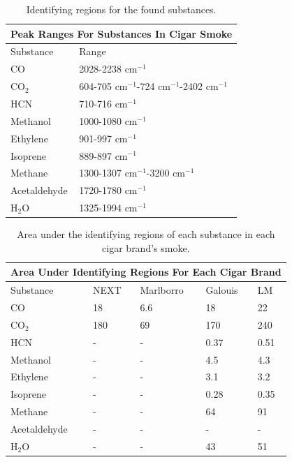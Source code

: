 \documentclass[reprint,amsmath,amssymb,aps, prl]{revtex4-2}
\begin{document}
\begin{table}[h]
    \begin{tabular}{ |p{2.3cm}|p{3cm}|  }
     \hline
     \multicolumn{2}{|c|}{Peak Ranges For Substances In Cigar Smoke} \\ \hline
     Substance & Range\\ \hline
     CO & 2028-2238 $\text{cm}^{-1}$\\ \hline
     $\text{CO}_{2}$ & 604-705 $\text{cm}^{-1}$\newline 717-724 $\text{cm}^{-1}$\newline 2248-2402 $\text{cm}^{-1}$\\ \hline
     HCN & 710-716 $\text{cm}^{-1}$\\ \hline
     Methanol & 1000-1080 $\text{cm}^{-1}$\\ \hline
     Ethylene & 901-997 $\text{cm}^{-1}$\\ \hline
     Isoprene & 889-897 $\text{cm}^{-1}$\\ \hline
     Methane & 1300-1307 $\text{cm}^{-1}$\newline 2820-3200 $\text{cm}^{-1}$\\ \hline
     Acetaldehyde & 1720-1780 $\text{cm}^{-1}$\\ \hline
     $\text{H}_{2}$O & 1325-1994 $\text{cm}^{-1}$\\ \hline
    \end{tabular}
    \caption{Identifying regions for the found substances.}
    \label{tbl:CigarSubstanceRegions}
\end{table}

\begin{table}[h]
    \begin{tabular}{ |p{1.9cm}|p{1.5cm}|p{1.5cm}|p{1.5cm}|p{1.5cm}|  }
     \hline
     \multicolumn{5}{|c|}{Area Under Identifying Regions For Each Cigar Brand} \\ \hline
     Substance & NEXT & Marlborro & Galouis & LM\\ \hline
     CO & 18 & 6.6 & 18 & 22 \\ \hline %
     $\text{CO}_{2}$ & 180 & 69 & 170 & 240 \\ \hline
     HCN  & - & - & 0.37 & 0.51 \\ \hline %
     Methanol & - & - & 4.5 & 4.3 \\ \hline %
     Ethylene & - & - & 3.1 & 3.2 \\ \hline %
     Isoprene & - & - & 0.28 & 0.35 \\ \hline %
     Methane & - & - & 64 & 91 \\ \hline %
     Acetaldehyde & - & - & - & - \\ \hline %
     $\text{H}_{2}$O & - & - & 43 & 51 \\ \hline
    \end{tabular}
    \caption{Area under the identifying regions of each substance in each cigar brand's smoke.}
    \label{tbl:CigarSubstanceAreas}
\end{table}
\end{document}
